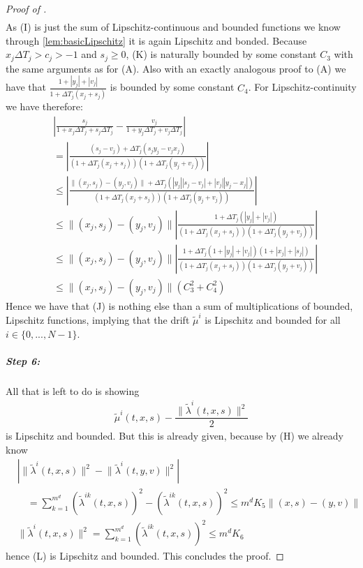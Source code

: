 \documentclass[12pt]{article}
\begin{document}
\begin{proof}[Proof of ]
\begin{align*}
		\end{align*}
		As (I) is just the sum of Lipschitz-continuous and bounded functions we know through \cref{lem:basicLipschitz} it is again Lipschitz and bonded. Because $x_j\Delta T_j > c_j > -1$ and $s_j \ge 0$, (K) is naturally bounded by some constant $C_3$ with the same arguments as for (A). Also with an exactly analogous proof to (A) we have that $\frac{1 + \left|y_j\right| + \left|v_j\right|}{1 + \Delta T_j(x_j + s_j)}$ is bounded by some constant $C_4$. For Lipschitz-continuity we have therefore:
		\begin{align*}
			&\left|\frac{s_j}{1 + x_j\Delta T_j + s_j\Delta T_j} - \frac{v_j}{1 + y_j\Delta T_j + v_j\Delta T_j} \right|\\
			&=\left|\frac{(s_j - v_j) + \Delta T_j(s_j y_j - v_jx_j)}{\left(1 + \Delta T_j(x_j + s_j)\right)\left(1 + \Delta T_j(y_j + v_j)\right)}\right|\\
			&\le \left|\frac{\lVert (x_j,s_j) - (y_j, v_j)\rVert + \Delta T_j(\left|y_j\right| \left|s_j - v_j\right| + \left|v_j\right| \left|y_j - x_j\right|)}{\left(1 + \Delta T_j(x_j + s_j)\right)\left(1 + \Delta T_j(y_j + v_j)\right)}\right|\\
			&\le \lVert (x_j,s_j) - (y_j, v_j)\rVert\left|\frac{1 + \Delta T_j(\left|y_j\right| + \left|v_j\right|)}{\left(1 + \Delta T_j(x_j + s_j)\right)\left(1 + \Delta T_j(y_j + v_j)\right)}\right|\\
			&\le \lVert (x_j,s_j) - (y_j, v_j)\rVert\left|\frac{1 + \Delta T_j\left(1 + \left|y_j\right| + \left|v_j\right|\right)\left(1 + \left|x_j\right| + \left|s_j\right|\right)}{\left(1 + \Delta T_j(x_j + s_j)\right)\left(1 + \Delta T_j(y_j + v_j)\right)}\right|\\
			&\le \lVert (x_j,s_j) - (y_j, v_j)\rVert  \left(C_3^2 + C_4^2\right)
		\end{align*}
		Hence we have that (J) is nothing else than a sum of multiplications of bounded, Lipschitz functions, implying that the drift $\tilde{\mu}^{i}$ is Lipschitz and bounded for all $i\in\{0,...,N-1\}$.
		\subparagraph{Step 6:}
		All that is left to do is showing 
		\begin{align*}
			\tilde{\mu}^i\left(t, x, s\right) - \dfrac{\lVert\tilde{\lambda}^{i}(t,x,s)\rVert^2}{2}\tag{L}
		\end{align*}
		is Lipschitz and bounded. But this is already given, because by (H) we already know 
		\begin{align*}
			&\left| \lVert\tilde{\lambda}^{i}(t,x,s)\rVert ^2 - \lVert\tilde{\lambda}^{i}(t,y,v)\rVert ^2\right| \\
			&\quad= \sum_{k=1}^{m^d}\left(\tilde{\lambda}^{i k}(t,x,s)\right)^2 - \left(\tilde{\lambda}^{i k}(t,x,s)\right)^2 \le m^dK_5\lVert(x,s) - (y,v)\rVert\\
			&\lVert\tilde{\lambda}^{i}(t,x,s)\rVert ^2 = \sum_{k=1}^{m^d}\left(\tilde{\lambda}^{i k}(t,x,s)\right)^2 \le m^d K_6
		\end{align*}
		hence (L) is Lipschitz and bounded. This concludes the proof.		
	\end{proof}
	
\end{document}
